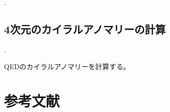 \documentclass[
  unicode,a4paper,10pt,
  xcolor = {dvipsnames,svgnames},
  hyperref ={colorlinks=true,citecolor=Navy,linkcolor=NavyBlue,urlcolor=purple},
  ja=standard,lualatex
]{beamer}
\begin{document}
\begin{frame}[plain]{\thesubsection. \subsecname}
  \tableofcontents
\end{frame}


\subsection{4次元のカイラルアノマリーの計算}


\begin{frame}{\thesubsection. \subsecname}

  QEDのカイラルアノマリーを計算する。
  

\end{frame}


\section{参考文献}
\begin{frame}{\secname}

  \scriptsize
  \beamertemplatetextbibitems
  
  

  \nocite{Fujikawa:2001a}
  \nocite{Choi:2020dws}

\end{frame}

\setcounter{framenumber}{\value{Appendix}}
\end{document}
